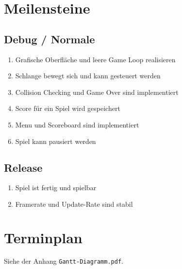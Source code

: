 \documentclass[a4paper, twosided, 11pt]{scrartcl}
\begin{document}
\section{Meilensteine}

\subsection{Debug / Normale}

\begin{enumerate}
  \item Grafische Oberfl\"ache und leere Game Loop realisieren
  \item Schlange bewegt sich und kann gesteuert werden
  \item Collision Checking und Game Over sind implementiert
  \item Score f\"ur ein Spiel wird gespeichert
  \item Menu und Scoreboard sind implementiert
  \item Spiel kann pausiert werden
\end{enumerate}

\subsection{Release}

\begin{enumerate}
  \item Spiel ist fertig und spielbar
  \item Framerate und Update-Rate sind stabil
\end{enumerate}

\section{Terminplan}
Siehe der Anhang \texttt{Gantt-Diagramm.pdf}.
\end{document}
